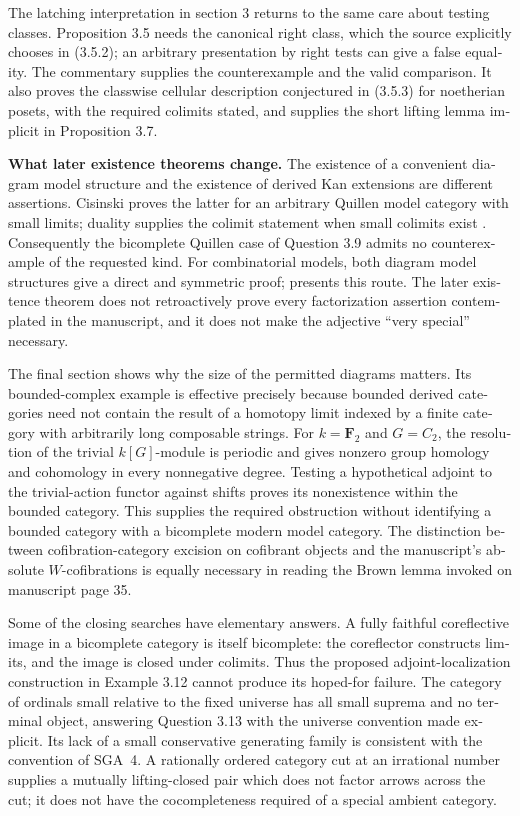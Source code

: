 \begin{otherlanguage}{english}
The latching interpretation in section 3 returns to the same care about
testing classes. Proposition 3.5 needs the canonical right class, which the
source explicitly chooses in (3.5.2); an arbitrary presentation by right
tests can give a false equality. The commentary supplies the counterexample
and the valid comparison. It also proves the classwise cellular description
conjectured in (3.5.3) for noetherian posets, with the required colimits stated,
and supplies the short lifting lemma implicit in Proposition 3.7.

\noindent\textbf{What later existence theorems change.}
The existence of a convenient diagram model structure and the existence of
derived Kan extensions are different assertions. Cisinski proves the latter
for an arbitrary Quillen model category with small limits; duality supplies
the colimit statement when small colimits exist
\citep[Theorem 6.11]{Cisinski2003}. Consequently the bicomplete Quillen
case of Question 3.9 admits no counterexample of the requested kind.
For combinatorial models, both diagram model structures give a direct and
symmetric proof; \citet[Theorem 1.28 and Proposition 1.30]{Groth2013} presents
this route. The later existence theorem does not retroactively prove every
factorization assertion contemplated in the manuscript, and it does not
make the adjective ``very special'' necessary.

The final section shows why the size of the permitted diagrams matters.
Its bounded-complex example is effective precisely because bounded derived
categories need not contain the result of a homotopy limit indexed by a
finite category with arbitrarily long composable strings. For
$k=\mathbf F_2$ and $G=C_2$, the resolution of the trivial $k[G]$-module is
periodic and gives nonzero group homology and cohomology in every
nonnegative degree. Testing a hypothetical adjoint to the trivial-action
functor against shifts proves its nonexistence within the bounded category.
This supplies the required obstruction without identifying a bounded
category with a bicomplete modern model category. The distinction between
cofibration-category excision on cofibrant objects and the manuscript's
absolute $W$-cofibrations is equally necessary in reading the Brown lemma
invoked on manuscript page 35.

Some of the closing searches have elementary answers. A fully faithful
coreflective image in a bicomplete category is itself bicomplete: the
coreflector constructs limits, and the image is closed under colimits.
Thus the proposed adjoint-localization construction in Example 3.12 cannot
produce its hoped-for failure. The category of ordinals small relative to
the fixed universe has all small suprema and no terminal object, answering
Question 3.13 with the universe convention made explicit. Its lack of a
small conservative generating family is consistent with the convention of
SGA~4. A rationally ordered category cut at an irrational number supplies
a mutually lifting-closed pair which does not factor arrows across the cut;
it does not have the cocompleteness required of a special ambient category.


\end{otherlanguage}
